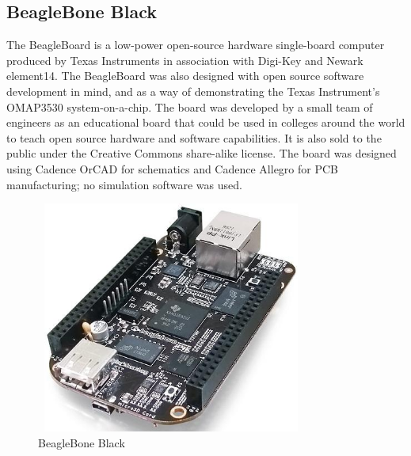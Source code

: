 \subsection{BeagleBone Black} The BeagleBoard is a low-power open-source hardware single-board computer produced by Texas Instruments in association with Digi-Key and Newark element14. The BeagleBoard was also designed with open source software development in mind, and as a way of demonstrating the Texas Instrument's OMAP3530 system-on-a-chip. The board was developed by a small team of engineers as an educational board that could be used in colleges around the world to teach open source hardware and software capabilities. It is also sold to the public under the Creative Commons share-alike license. The board was designed using Cadence OrCAD for schematics and Cadence Allegro for PCB manufacturing; no simulation software was used.
\begin{figure}[ht]
	        \centering
	        \includegraphics[width=3.5in, height=3in]{images/beaglebone_black.png}
	        \caption{BeagleBone Black}
\end{figure}
